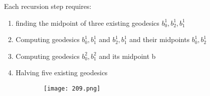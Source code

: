 \documentclass{article}
\begin{document}
Each recursion step requires:

\begin{enumerate}
    \item finding the midpoint of three existing geodesics $b_0^1,b_2^1,b_1^1$
    \item Computing geodesics $b_0^1,b_1^1$ and $b_2^1,b_1^1$ and their midpoints $b_0^1,b_2^1$
    \item Computing geodesics $b_0^2,b_1^2$ and its midpoint b
    \item Halving five existing geodesics
\end{enumerate}

\begin{figure}[ht!]
  \centering
  \begin{subfigure}[b]{0.8\linewidth}
    \texttt{[image: 209.png]}
  \end{subfigure}
\end{figure}
\end{document}
